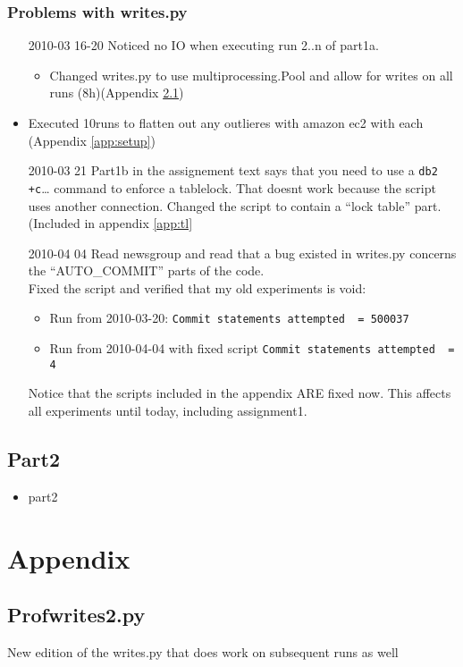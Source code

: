 \subsection{Problems with writes.py}
\begin{itemize}
  \item[2010-03 16-20] Noticed no IO when executing run 2..n of part1a.
    \begin{itemize}
      \item Changed writes.py to use multiprocessing.Pool and allow for writes on
    all runs (8h)(Appendix \ref{app:prof})
   \end{itemize}
  \item Executed 10runs to flatten out any outlieres with amazon ec2 with each
    (Appendix \ref{app:setup})
  \item[2010-03 21] Part1b in the assignement text says that you need to use a \verb|db2 +c|\ldots
    command to enforce a tablelock. That doesnt work because the script uses
    another connection. Changed the script to contain a ``lock table'' part.
    (Included in appendix \ref{app:tl}
  \item[2010-04 04] Read newsgroup and read that a bug existed in writes.py
    concerns the ``AUTO\_COMMIT'' parts of the code.\\
    Fixed the script and verified that my old experiments is void:
    \begin{itemize}
      \item Run from 2010-03-20: \verb|Commit statements attempted  = 500037|
      \item Run from 2010-04-04 with fixed script \verb|Commit statements attempted  = 4|
    \end{itemize}
    Notice that the scripts included in the appendix ARE fixed now. 
    This affects all experiments until today, including assignment1.
\end{itemize}

\section{Part2}
\begin{itemize}
  \item part2
\end{itemize}

\appendix
\chapter{Appendix}
\section{Profwrites2.py}\label{app:prof}
New edition of the writes.py that does work on subsequent runs as well

